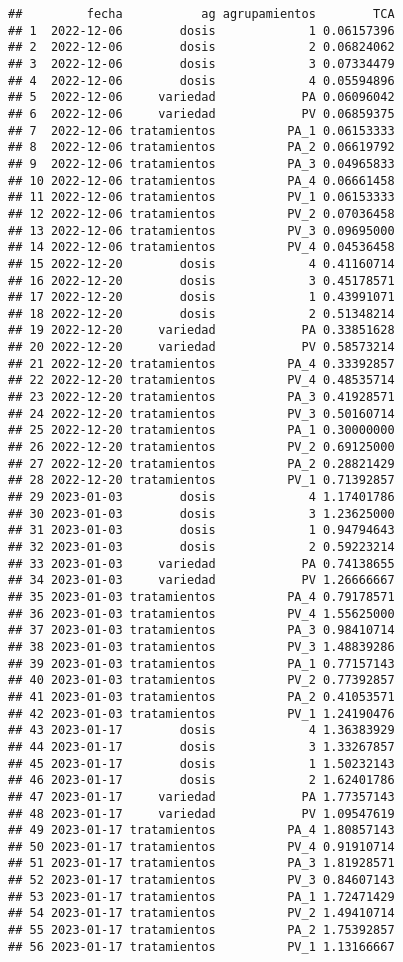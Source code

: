 \documentclass[
]{article}
\begin{document}
\begin{verbatim}
##         fecha           ag agrupamientos        TCA
## 1  2022-12-06        dosis             1 0.06157396
## 2  2022-12-06        dosis             2 0.06824062
## 3  2022-12-06        dosis             3 0.07334479
## 4  2022-12-06        dosis             4 0.05594896
## 5  2022-12-06     variedad            PA 0.06096042
## 6  2022-12-06     variedad            PV 0.06859375
## 7  2022-12-06 tratamientos          PA_1 0.06153333
## 8  2022-12-06 tratamientos          PA_2 0.06619792
## 9  2022-12-06 tratamientos          PA_3 0.04965833
## 10 2022-12-06 tratamientos          PA_4 0.06661458
## 11 2022-12-06 tratamientos          PV_1 0.06153333
## 12 2022-12-06 tratamientos          PV_2 0.07036458
## 13 2022-12-06 tratamientos          PV_3 0.09695000
## 14 2022-12-06 tratamientos          PV_4 0.04536458
## 15 2022-12-20        dosis             4 0.41160714
## 16 2022-12-20        dosis             3 0.45178571
## 17 2022-12-20        dosis             1 0.43991071
## 18 2022-12-20        dosis             2 0.51348214
## 19 2022-12-20     variedad            PA 0.33851628
## 20 2022-12-20     variedad            PV 0.58573214
## 21 2022-12-20 tratamientos          PA_4 0.33392857
## 22 2022-12-20 tratamientos          PV_4 0.48535714
## 23 2022-12-20 tratamientos          PA_3 0.41928571
## 24 2022-12-20 tratamientos          PV_3 0.50160714
## 25 2022-12-20 tratamientos          PA_1 0.30000000
## 26 2022-12-20 tratamientos          PV_2 0.69125000
## 27 2022-12-20 tratamientos          PA_2 0.28821429
## 28 2022-12-20 tratamientos          PV_1 0.71392857
## 29 2023-01-03        dosis             4 1.17401786
## 30 2023-01-03        dosis             3 1.23625000
## 31 2023-01-03        dosis             1 0.94794643
## 32 2023-01-03        dosis             2 0.59223214
## 33 2023-01-03     variedad            PA 0.74138655
## 34 2023-01-03     variedad            PV 1.26666667
## 35 2023-01-03 tratamientos          PA_4 0.79178571
## 36 2023-01-03 tratamientos          PV_4 1.55625000
## 37 2023-01-03 tratamientos          PA_3 0.98410714
## 38 2023-01-03 tratamientos          PV_3 1.48839286
## 39 2023-01-03 tratamientos          PA_1 0.77157143
## 40 2023-01-03 tratamientos          PV_2 0.77392857
## 41 2023-01-03 tratamientos          PA_2 0.41053571
## 42 2023-01-03 tratamientos          PV_1 1.24190476
## 43 2023-01-17        dosis             4 1.36383929
## 44 2023-01-17        dosis             3 1.33267857
## 45 2023-01-17        dosis             1 1.50232143
## 46 2023-01-17        dosis             2 1.62401786
## 47 2023-01-17     variedad            PA 1.77357143
## 48 2023-01-17     variedad            PV 1.09547619
## 49 2023-01-17 tratamientos          PA_4 1.80857143
## 50 2023-01-17 tratamientos          PV_4 0.91910714
## 51 2023-01-17 tratamientos          PA_3 1.81928571
## 52 2023-01-17 tratamientos          PV_3 0.84607143
## 53 2023-01-17 tratamientos          PA_1 1.72471429
## 54 2023-01-17 tratamientos          PV_2 1.49410714
## 55 2023-01-17 tratamientos          PA_2 1.75392857
## 56 2023-01-17 tratamientos          PV_1 1.13166667
\end{verbatim}
\end{document}
